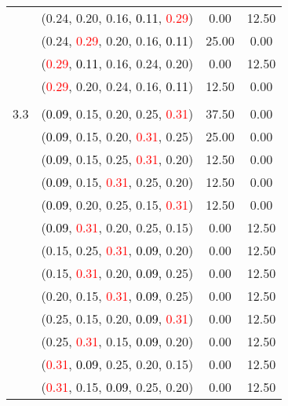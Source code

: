 \documentclass[10pt,a4paper]{report}
\begin{document}
\begin{center}
\begin{longtable}{clcc}
			&(0.24, 0.20, 0.16, \textcolor{black}{0.11}, \textcolor{red}{0.29})&0.00&12.50\\
			&(0.24, \textcolor{red}{0.29}, 0.20, 0.16, \textcolor{black}{0.11})&25.00&0.00\\
			&(\textcolor{red}{0.29}, \textcolor{black}{0.11}, 0.16, 0.24, 0.20)&0.00&12.50\\
			&(\textcolor{red}{0.29}, 0.20, 0.24, 0.16, \textcolor{black}{0.11})&12.50&0.00\\
		&&&\\
		3.3			&(\textcolor{black}{0.09}, 0.15, 0.20, 0.25, \textcolor{red}{0.31})&37.50&0.00\\
			&(\textcolor{black}{0.09}, 0.15, 0.20, \textcolor{red}{0.31}, 0.25)&25.00&0.00\\
			&(\textcolor{black}{0.09}, 0.15, 0.25, \textcolor{red}{0.31}, 0.20)&12.50&0.00\\
			&(\textcolor{black}{0.09}, 0.15, \textcolor{red}{0.31}, 0.25, 0.20)&12.50&0.00\\
			&(\textcolor{black}{0.09}, 0.20, 0.25, 0.15, \textcolor{red}{0.31})&12.50&0.00\\
			&(\textcolor{black}{0.09}, \textcolor{red}{0.31}, 0.20, 0.25, 0.15)&0.00&12.50\\
			&(0.15, 0.25, \textcolor{red}{0.31}, \textcolor{black}{0.09}, 0.20)&0.00&12.50\\
			&(0.15, \textcolor{red}{0.31}, 0.20, \textcolor{black}{0.09}, 0.25)&0.00&12.50\\
			&(0.20, 0.15, \textcolor{red}{0.31}, \textcolor{black}{0.09}, 0.25)&0.00&12.50\\
			&(0.25, 0.15, 0.20, \textcolor{black}{0.09}, \textcolor{red}{0.31})&0.00&12.50\\
			&(0.25, \textcolor{red}{0.31}, 0.15, \textcolor{black}{0.09}, 0.20)&0.00&12.50\\
			&(\textcolor{red}{0.31}, \textcolor{black}{0.09}, 0.25, 0.20, 0.15)&0.00&12.50\\
			&(\textcolor{red}{0.31}, 0.15, \textcolor{black}{0.09}, 0.25, 0.20)&0.00&12.50\\
		\bottomrule
	\end{longtable}
\end{center}
\end{document}
